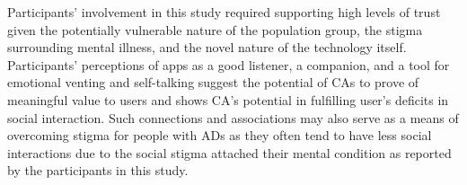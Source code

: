         Participants' involvement in this study required supporting high levels of trust given the potentially vulnerable nature of the population group, the stigma surrounding mental illness, and the novel nature of the technology itself.
        Participants' perceptions of \acp{app} as a good listener, a companion, and a tool for emotional venting and self-talking suggest the potential of \ac{CA}s to prove of meaningful value to users and shows
        \ac{CA}'s potential in fulfilling user's deficits in social interaction.  
        Such connections and associations may also serve as a means of overcoming stigma for people with \ac{AD}s as they often tend to have less social interactions due to the social stigma attached their mental condition as reported by the participants in this study.
        
        

        
        
